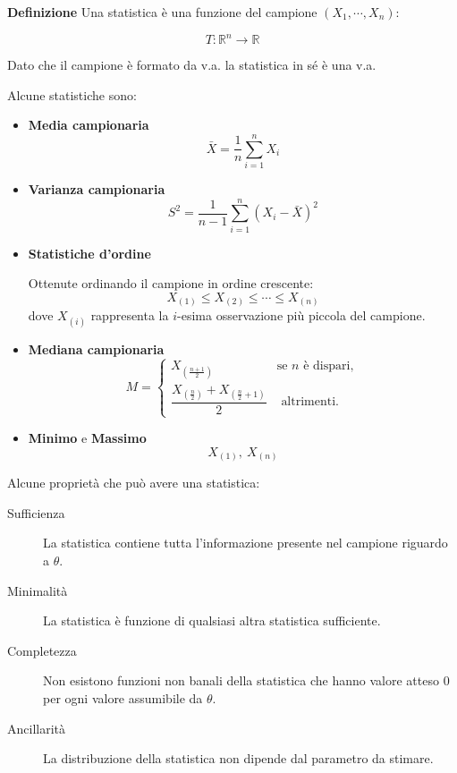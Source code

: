 \documentclass{article}
\newcommand{\df}{\noindent\textbf{Definizione} }
\begin{document}
\df Una statistica è una funzione del campione $(X_1,\cdots,X_n)$:

$$T:\mathbb{R}^n\rightarrow\mathbb{R}$$

Dato che il campione è formato da v.a. la statistica in sé è una v.a.\newline

Alcune statistiche sono:
\begin{itemize}
    \item \textbf{Media campionaria}
    \[
        \bar X=\frac1n\sum_{i=1}^n X_i
    \]

    \item \textbf{Varianza campionaria}
    \[
        S^2=\frac1{n-1}\sum_{i=1}^n (X_i-\bar X)^2
    \]

    \item \textbf{Statistiche d'ordine}

    Ottenute ordinando il campione in ordine crescente:
    \[
        X_{(1)}\le X_{(2)}\le\cdots\le X_{(n)}
    \]
    dove \(X_{(i)}\) rappresenta la \(i\)-esima osservazione più piccola del campione.

    \item \textbf{Mediana campionaria}
    \[
        M=
        \begin{cases}
            X_{\left(\frac{n+1}{2}\right)} & \text{se } n \text{ è dispari},\\[1ex]
            \dfrac{X_{\left(\frac n2\right)}+X_{\left(\frac n2+1\right)}}{2}
            & \text{ altrimenti}.
        \end{cases}
    \]

    \item \textbf{Minimo} e \textbf{Massimo}
    \[
        X_{(1)},\ X_{(n)}
    \]

\end{itemize}

\vspace{7pt}

Alcune proprietà che può avere una statistica:
\begin{description}
    \item[Sufficienza] 

        La statistica contiene tutta l'informazione presente nel campione riguardo a $\theta$.
    
    \item[Minimalità] 

        La statistica è funzione di qualsiasi altra statistica sufficiente.
    
    \item[Completezza]

        Non esistono funzioni non banali della statistica che hanno valore atteso 0 per ogni valore assumibile da $\theta$.

    \item[Ancillarità]

        La distribuzione della statistica non dipende dal parametro da stimare.
    
\end{description}
\end{document}
